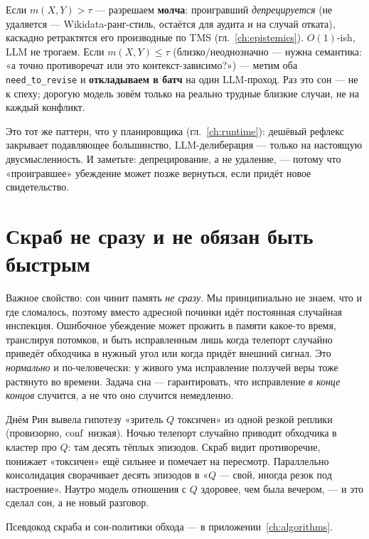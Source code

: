 \begin{principle}
Если $m(X,Y)>\tau$ — разрешаем \textbf{молча}: проигравший \emph{депрецируется}
(не удаляется — Wikidata-ранг-стиль, остаётся для аудита и на случай отката),
каскадно ретрактятся его производные по TMS (гл.~\ref{ch:epistemics}). $O(1)$-ish,
LLM не трогаем. Если $m(X,Y)\le\tau$ (близко/неоднозначно — нужна семантика: «а точно
противоречат или это контекст-зависимо?») — метим оба \texttt{need\_to\_revise} и
\textbf{откладываем в батч} на один LLM-проход. Раз это сон — не к спеху; дорогую
модель зовём только на реально трудные близкие случаи, не на каждый конфликт.
\end{principle}

Это тот же паттерн, что у планировщика (гл.~\ref{ch:runtime}): дешёвый рефлекс
закрывает подавляющее большинство, LLM-делиберация — только на настоящую
двусмысленность. И заметьте: депрецирование, а не удаление, — потому что «проигравшее»
убеждение может позже вернуться, если придёт новое свидетельство.

\section{Скраб не сразу и не обязан быть быстрым}

Важное свойство: сон чинит память \emph{не сразу}. Мы принципиально не знаем, что и
где сломалось, поэтому вместо адресной починки идёт постоянная случайная инспекция.
Ошибочное убеждение может прожить в памяти какое-то время, транслируя потомков, и
быть исправленным лишь когда телепорт случайно приведёт обходчика в нужный угол или
когда придёт внешний сигнал. Это \emph{нормально} и по-человечески: у живого ума
исправление ползучей веры тоже растянуто во времени. Задача сна — гарантировать, что
исправление \emph{в конце концов} случится, а не что оно случится немедленно.

\begin{workedbox}
Днём Рин вывела гипотезу «зритель $Q$ токсичен» из одной резкой реплики (провизорно,
$\mathrm{conf}$ низкая). Ночью телепорт случайно приводит обходчика в кластер про $Q$:
там десять тёплых эпизодов. Скраб видит противоречие, понижает «токсичен» ещё
сильнее и помечает на пересмотр. Параллельно консолидация сворачивает десять
эпизодов в «$Q$ — свой, иногда резок под настроение». Наутро модель отношения с $Q$
здоровее, чем была вечером, — и это сделал сон, а не новый разговор.
\end{workedbox}

Псевдокод скраба и сон-политики обхода — в приложении~\ref{ch:algorithms}.
